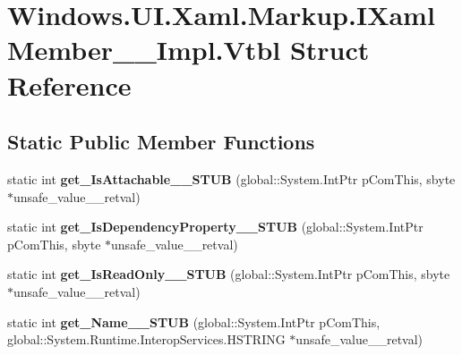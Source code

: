 \hypertarget{struct_windows_1_1_u_i_1_1_xaml_1_1_markup_1_1_i_xaml_member_____impl_1_1_vtbl}{}\section{Windows.\+U\+I.\+Xaml.\+Markup.\+I\+Xaml\+Member\+\_\+\+\_\+\+Impl.\+Vtbl Struct Reference}
\label{struct_windows_1_1_u_i_1_1_xaml_1_1_markup_1_1_i_xaml_member_____impl_1_1_vtbl}
\subsection*{Static Public Member Functions}
\begin{DoxyCompactItemize}
\item 
\mbox{\label{struct_windows_1_1_u_i_1_1_xaml_1_1_markup_1_1_i_xaml_member_____impl_1_1_vtbl_a1e4acc27c4a3f05a886512f1dc1c417d}} 
static int {\bfseries get\+\_\+\+Is\+Attachable\+\_\+\+\_\+\+S\+T\+UB} (global\+::\+System.\+Int\+Ptr p\+Com\+This, sbyte $\ast$unsafe\+\_\+value\+\_\+\+\_\+retval)
\item 
\mbox{\label{struct_windows_1_1_u_i_1_1_xaml_1_1_markup_1_1_i_xaml_member_____impl_1_1_vtbl_a541291821e8f6d35fe9dfe24080234c6}} 
static int {\bfseries get\+\_\+\+Is\+Dependency\+Property\+\_\+\+\_\+\+S\+T\+UB} (global\+::\+System.\+Int\+Ptr p\+Com\+This, sbyte $\ast$unsafe\+\_\+value\+\_\+\+\_\+retval)
\item 
\mbox{\label{struct_windows_1_1_u_i_1_1_xaml_1_1_markup_1_1_i_xaml_member_____impl_1_1_vtbl_acac20098b80b3075bcf8a3c21ba8d6bb}} 
static int {\bfseries get\+\_\+\+Is\+Read\+Only\+\_\+\+\_\+\+S\+T\+UB} (global\+::\+System.\+Int\+Ptr p\+Com\+This, sbyte $\ast$unsafe\+\_\+value\+\_\+\+\_\+retval)
\item 
\mbox{\label{struct_windows_1_1_u_i_1_1_xaml_1_1_markup_1_1_i_xaml_member_____impl_1_1_vtbl_a62fa2b1c4795a9faf836bcb5d053a965}} 
static int {\bfseries get\+\_\+\+Name\+\_\+\+\_\+\+S\+T\+UB} (global\+::\+System.\+Int\+Ptr p\+Com\+This, global\+::\+System.\+Runtime.\+Interop\+Services.\+H\+S\+T\+R\+I\+NG $\ast$unsafe\+\_\+value\+\_\+\+\_\+retval)

\end{DoxyCompactItemize}
